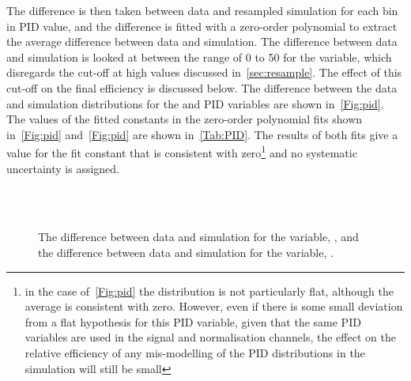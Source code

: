 The difference is then taken between data and resampled simulation for each bin in PID value, and the difference is fitted with a zero-order polynomial to extract the average difference between data and simulation. The difference between data and simulation is looked at between the range of 0 to 50 for the \dllppi variable, which disregards the cut-off at high \dllppi values discussed in~\autoref{sec:resample}. The effect of this cut-off on the final efficiency is discussed below.  The difference between the data and simulation distributions for the \dllppi and \dllkpi PID variables are shown in~\autoref{Fig:pid}. The values of the fitted constants in the zero-order polynomial fits shown in~\autoref{Fig:pid}\protect{} and~\autoref{Fig:pid}\protect{} are shown in~\autoref{Tab:PID}. The results of both fits give a value for the fit constant that is consistent with zero\footnote{in the case of~\autoref{Fig:pid}\protect{} the distribution is not particularly flat, although the average is consistent with zero. However, even if there is some small deviation from a flat hypothesis for this PID variable, given that the same PID variables are used in the signal and normalisation channels, the effect on the relative efficiency of any mis-modelling of the PID distributions in the simulation will still be small} and no systematic uncertainty is assigned.    %

\begin{figure}[h!]
  \def\nh{0.7\textwidth}
  \centering

   \\
  \\%
  \caption{The difference between data and simulation for the \dllkpi variable, \protect{}, and the difference between data and simulation for the \dllppi variable, \protect{}.}
  \label{Fig:pid}
\end{figure}

